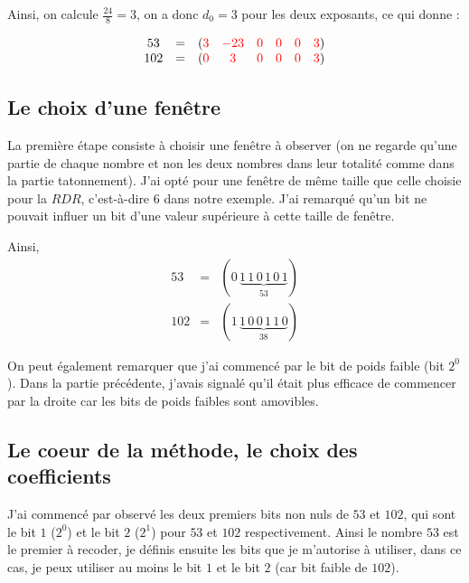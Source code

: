 \documentclass[12pt, a4paper]{memoir}
\begin{document}
 Ainsi, on calcule $\frac{24}{8} = 3$, on a donc $d_0 = 3$ pour les deux exposants, ce qui donne :
 
      $$\begin{array}{cccccccc}
  53 & = & (\textcolor{red}{3} & \textcolor{red}{-23} & \textcolor{red}{0} & \textcolor{red}{0} & \textcolor{red}{0} & \textcolor{red}{3}) \\
  102 & = & (\textcolor{red}{0} & \textcolor{red}{3} & \textcolor{red}{0} & \textcolor{red}{0} & \textcolor{red}{0} & \textcolor{red}{3})
 \end{array}$$
 
 
\subsection{Le choix d'une fenêtre}

La première étape consiste à choisir une fenêtre à observer (on ne regarde qu'une partie de chaque nombre et 
non les deux nombres dans leur totalité comme dans la partie tatonnement).
J'ai opté pour une fenêtre de même taille que celle choisie pour la $RDR$, c'est-à-dire $6$ dans notre exemple.
J'ai remarqué qu'un bit ne pouvait influer un bit d'une valeur supérieure à cette taille de fenêtre.

Ainsi, \\
  $$\begin{array}{ccc}
53 & = & (0 \, \underbrace{1 \, 1 \, 0 \, 1 \, 0 \, 1}_{53}) \\
102 & = & (1 \, \underbrace{1 \, 0 \, 0 \, 1 \, 1 \, 0}_{38})
 \end{array}$$
 
On peut également remarquer que j'ai commencé par le bit de poids faible (bit $2^0$).
Dans la partie précédente, j'avais signalé qu'il était plus efficace de commencer par la droite car les bits de poids 
faibles sont amovibles.

\subsection{Le coeur de la méthode, le choix des coefficients}

J'ai commencé par observé les deux premiers bits non nuls de $53$ et $102$, qui sont le bit $1$ ($2^0$) et le 
bit $2$ ($2^1$) pour $53$ et $102$ respectivement.
Ainsi le nombre $53$ est le premier à recoder, je définis ensuite les bits que je m'autorise à utiliser, dans ce cas, je peux
utiliser au moins le bit $1$ et le bit $2$ (car bit faible de $102$).
\end{document}

